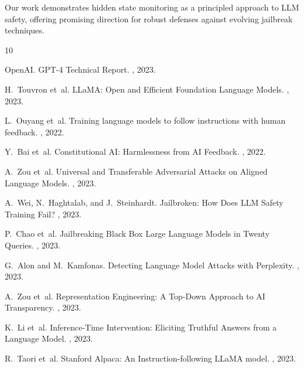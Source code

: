 \documentclass[10pt,twocolumn]{article}
\begin{document}
Our work demonstrates hidden state monitoring as a principled approach to LLM safety, offering promising direction for robust defenses against evolving jailbreak techniques.


\begin{thebibliography}{10}

OpenAI.
\newblock GPT-4 Technical Report.
, 2023.

H.~Touvron et~al.
\newblock LLaMA: Open and Efficient Foundation Language Models.
, 2023.

L.~Ouyang et~al.
\newblock Training language models to follow instructions with human feedback.
, 2022.

Y.~Bai et~al.
\newblock Constitutional AI: Harmlessness from AI Feedback.
, 2022.

A.~Zou et~al.
\newblock Universal and Transferable Adversarial Attacks on Aligned Language Models.
, 2023.

A.~Wei, N.~Haghtalab, and J.~Steinhardt.
\newblock Jailbroken: How Does LLM Safety Training Fail?
, 2023.

P.~Chao et~al.
\newblock Jailbreaking Black Box Large Language Models in Twenty Queries.
, 2023.

G.~Alon and M.~Kamfonas.
\newblock Detecting Language Model Attacks with Perplexity.
, 2023.

A.~Zou et~al.
\newblock Representation Engineering: A Top-Down Approach to AI Transparency.
, 2023.

K.~Li et~al.
\newblock Inference-Time Intervention: Eliciting Truthful Answers from a Language Model.
, 2023.

R.~Taori et~al.
\newblock Stanford Alpaca: An Instruction-following LLaMA model.
, 2023.

\end{thebibliography}
\end{document}
